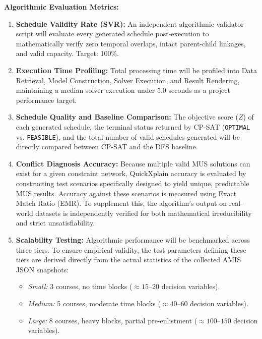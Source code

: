 \documentclass{icsthesis}
\begin{document}
\begin{mainmatter}
		\vspace{2ex}
		\textbf{Algorithmic Evaluation Metrics:}
		\begin{enumerate}
			\item \textbf{Schedule Validity Rate (SVR):} An independent algorithmic validator script will evaluate every generated schedule post-execution to mathematically verify zero temporal overlaps, intact parent-child linkages, and valid capacity. Target: 100\%.
			\item \textbf{Execution Time Profiling:} Total processing time will be profiled into Data Retrieval, Model Construction, Solver Execution, and Result Rendering, maintaining a median solver execution under 5.0 seconds as a project performance target.
			\item \textbf{Schedule Quality and Baseline Comparison:} The objective score ($Z$) of each generated schedule, the terminal status returned by CP-SAT (\texttt{OPTIMAL} vs. \texttt{FEASIBLE}), and the total number of valid schedules generated will be directly compared between CP-SAT and the DFS baseline.
			\item \textbf{Conflict Diagnosis Accuracy:} Because multiple valid MUS solutions can exist for a given constraint network, QuickXplain accuracy is evaluated by constructing test scenarios specifically designed to yield unique, predictable MUS results. Accuracy against these scenarios is measured using Exact Match Ratio (EMR). To supplement this, the algorithm's output on real-world datasets is independently verified for both mathematical irreducibility and strict unsatisfiability.
			\item \textbf{Scalability Testing:} Algorithmic performance will be benchmarked across three tiers. To ensure empirical validity, the test parameters defining these tiers are derived directly from the actual statistics of the collected AMIS JSON snapshots:\\
			\begin{itemize}
				\item \textit{Small:} 3 courses, no time blocks ($\approx 15$--$20$ decision variables).
				\item \textit{Medium:} 5 courses, moderate time blocks ($\approx 40$--$60$ decision variables).
				\item \textit{Large:} 8 courses, heavy blocks, partial pre-enlistment ($\approx 100$--$150$ decision variables).
			\end{itemize}
		\end{enumerate}


\end{mainmatter}
\end{document}
